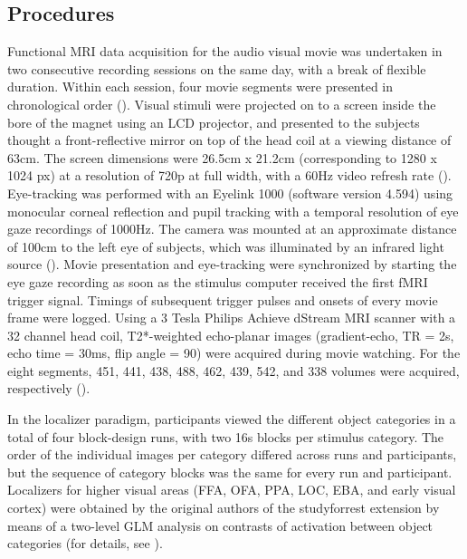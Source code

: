 \documentclass[a4paper, 12pt]{scrreprt}
\begin{document}
\subsection{Procedures}
Functional MRI data acquisition for the audio visual movie was undertaken in two consecutive recording sessions on the same day, with a break of flexible duration. Within each session, four movie segments were presented in chronological order (\cite{hanke2016studyforrest}). Visual stimuli were projected on to a screen inside the bore of the magnet using an LCD projector, and presented to the subjects thought a front-reflective mirror on top of the head coil at a viewing distance of 63cm. The screen dimensions were 26.5cm x 21.2cm (corresponding to 1280 x 1024 px) at a resolution of 720p at full width, with a 60Hz video refresh rate (\cite{sengupta2016studyforrest}). Eye-tracking was performed with an Eyelink 1000 (software version 4.594) using monocular corneal reflection and pupil tracking with a temporal resolution of eye gaze recordings of 1000Hz. The camera was mounted at an approximate distance of 100cm to the left eye of subjects, which was illuminated
by an infrared light source (\cite{hanke2016studyforrest}). Movie presentation and eye-tracking were synchronized by starting the eye gaze recording as soon as the stimulus computer received the first fMRI trigger signal. Timings of subsequent trigger pulses and onsets of every movie frame
were logged. Using a 3 Tesla Philips Achieve dStream MRI scanner with a 32 channel head coil, T2*-weighted echo-planar images (gradient-echo, TR = 2s, echo time = 30ms, flip angle = 90) were acquired during movie watching. For the eight segments, 451, 441, 438, 488, 462, 439, 542, and 338 volumes were acquired, respectively (\cite{hanke2016studyforrest}).\newline

In the localizer paradigm, participants viewed the different object categories in a total of four block-design runs, with two 16s blocks per stimulus category. The order of the individual images per category differed across runs and participants, but the sequence of category blocks was the same for every run and participant. Localizers for higher visual areas (FFA, OFA, PPA, LOC, EBA, and early visual cortex) were obtained by the original authors of the studyforrest extension by means of a two-level GLM analysis on contrasts of activation between object categories (for details, see \cite{sengupta2016studyforrest}).
\end{document}
